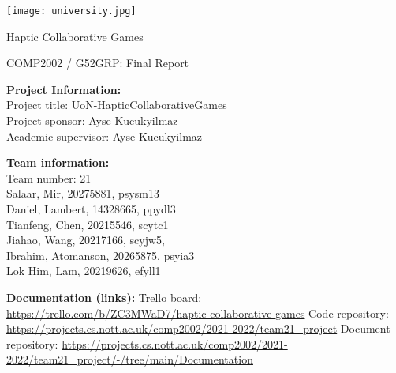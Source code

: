 \documentclass[a4paper]{article}
\begin{document}


\begin{titlepage}
   \begin{center}
        \texttt{[image: university.jpg]}
        \vspace*{2cm}

        \huge
        Haptic Collaborative Games
        
        \vspace{0.3cm}
        
        \LARGE
        COMP2002 / G52GRP: Final Report
            
        \vspace{2cm}

        \Large
        \textbf{Project Information:} 
         \vspace{0.2cm}
         \protect\\     Project title:
        UoN-HapticCollaborativeGames\\
        Project sponsor: Ayse Kucukyilmaz\\
        Academic supervisor: Ayse Kucukyilmaz\\
        
       
        \vspace{1cm}
       
        \textbf{Team information:}\\
        \vspace{0.1cm}
        Team number: 21\\
        \vspace{0.1cm}
        Salaar, Mir, 20275881, psysm13 \\
        Daniel, Lambert, 14328665, ppydl3\\
        Tianfeng, Chen, 20215546, scytc1\\
        Jiahao, Wang, 20217166, scyjw5, \\
        Ibrahim, Atomanson, 20265875, psyia3\\
        Lok Him, Lam, 20219626, efyll1\\

   \end{center}
\end{titlepage}

\newpage
\textbf{Documentation (links):}\vspace{0.5cm} \newline
\hspace*{10mm} Trello board: \url{https://trello.com/b/ZC3MWaD7/haptic-collaborative-games}\vspace{0.5cm} \newline
\hspace*{10mm} Code repository: \url{https://projects.cs.nott.ac.uk/comp2002/2021-2022/team21_project}\vspace{0.5cm} \newline
\hspace*{10mm} Document repository: \url{https://projects.cs.nott.ac.uk/comp2002/2021-2022/team21_project/-/tree/main/Documentation} \newline
\newpage 
\end{document}
